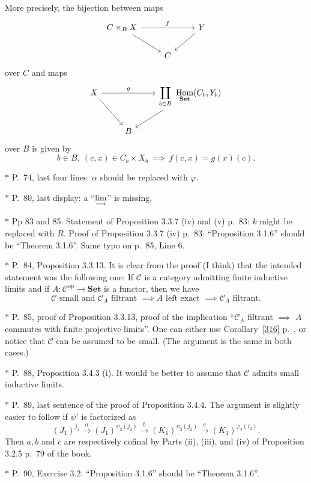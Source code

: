 \documentclass[12pt]{article}
\theoremstyle{remark}
\theoremstyle{definition}
\newcommand{\C}{\mathcal C}
\newcommand{\Set}{\mathbf{Set}}
\newcommand{\xr}{\xrightarrow}
\newcommand{\colim}{\operatornamewithlimits{\underset{\longrightarrow}{lim}}}
\DeclareMathOperator{\Hom}{Hom}%
\DeclareMathOperator{\op}{op}
\begin{document}
More precisely, the bijection between maps
$$
\begin{tikzcd}
C\times_BX\ar{dr}\ar{rr}{f}&&Y\ar{dl}\\ 
{}&C
\end{tikzcd}
$$
over $C$ and maps
$$
\begin{tikzcd}
X\ar{dr}\ar{rr}{g}&&\displaystyle\coprod_{b\in B}\ \Hom_{\Set}(C_b,Y_b)\ar{dl}\\ 
{}&B
\end{tikzcd}
$$
over $B$ is given by 
$$
b\in B,\ (c,x)\in C_b\times X_b\ \implies\ f(c,x)=g(x)(c).
$$

\noindent $*$ P.~74, last four lines: $\alpha$ should be replaced with $\varphi$.

\noindent $*$ P.~80, last display: a ``$\displaystyle\colim$'' is missing.

\noindent $*$ Pp 83 and 85: Statement of Proposition 3.3.7 (iv) and (v) p.~83: $k$ might be replaced with $R$. %
Proof of Proposition 3.3.7 (iv) p.~83: ``Proposition 3.1.6'' should be ``Theorem 3.1.6''. Same typo on p.~85, Line 6.

\noindent $*$ P.~84, Proposition 3.3.13. It is clear from the proof (I think) that the intended statement was the following one: If $\C$ is a category admitting finite inductive limits and if $A:\C^{\op}\to\Set$ is a functor, then we have 
$$
\C\text{ small and }\C_A\text{ filtrant }\implies A\text{ left exact }\implies\C_A\text{ filtrant}.
$$

\noindent $*$ P.~85, proof of Proposition 3.3.13, proof of the implication ``$\C_A$ filtrant $\implies$ $A$ commutes with finite projective limits''. One can either use Corollary~\ref{316} p.~\pageref{316}, or notice that $\C$ can be assumed to be small. (The argument is the same in both cases.)

\noindent $*$ P.~88, Proposition 3.4.3 (i). It would be better to assume that $\C$ admits small inductive limits.

\noindent $*$ P.~89, last sentence of the proof of Proposition 3.4.4. The argument is slightly easier to follow if $\psi'$ is factorized as 
$$
(J_1)^{j_2}\xr a(J_1)^{\psi_2(j_2)}\xr b(K_1)^{\psi_2(j_2)}\xr c(K_1)^{\varphi_2(i_2)}.
$$ 
Then $a,b$ and $c$ are respectively cofinal by Parts (ii), (iii), and (iv) of Proposition 3.2.5 p.~79 of the book.

\noindent $*$ P.~90, Exercise 3.2: ``Proposition 3.1.6'' should be ``Theorem 3.1.6''.
\end{document}

